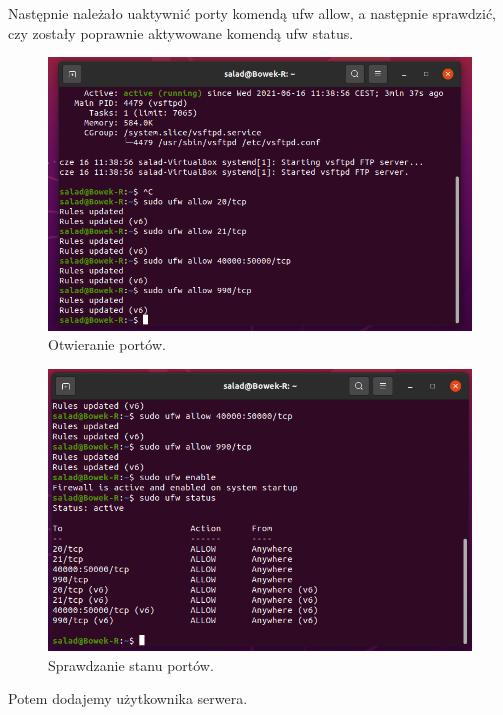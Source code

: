 \documentclass{article}
\begin{document}
Następnie należało uaktywnić porty komendą ufw allow, a następnie sprawdzić, czy zostały poprawnie aktywowane komendą ufw status.

\begin{figure}[H]
    \centering
    \includegraphics[scale = 0.65]{ftp/ftp_porty.png}  
    \caption{Otwieranie portów.}
    \label{4}
\end{figure}

\newpage
\begin{figure}[H]
    \centering
    \includegraphics[scale = 0.65]{ftp/ftp_active.png}  
    \caption{Sprawdzanie stanu portów.}
    \label{5}
\end{figure}

Potem dodajemy użytkownika serwera.
\end{document}
